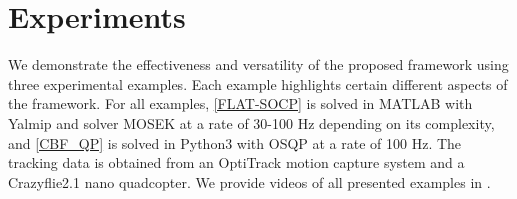 \documentclass[journal,10pt]{IEEEtran}
\newif\ifdraft
\newcommand{\XX}[1]{\ifdraft{\color{red}[{\bf XX}: #1]}\fi}
\newcommand{\VF}[1]{\ifdraft{\color{blue}[{\bf VF}: #1]}\fi}
\begin{document}
\section{Experiments}\label{sec:exper}
We demonstrate the effectiveness and versatility of the proposed framework using three experimental examples. Each example highlights certain different aspects of the framework. For all examples, \eqref{FLAT-SOCP} is solved in MATLAB with Yalmip \cite{Lofberg2004} and solver MOSEK \cite{mosek} at a rate of 30-100 Hz depending on its complexity, and \eqref{CBF_QP} is solved in Python3 with OSQP \cite{osqp} at a rate of 100 Hz. The tracking data is obtained from an OptiTrack motion capture system and a Crazyflie2.1 nano quadcopter. We provide videos of all presented examples in \cite{victor21video}.

\end{document}
